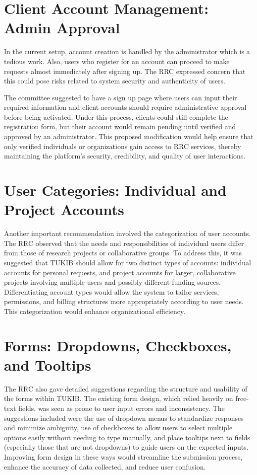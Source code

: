 \section{Client Account Management: Admin Approval}
In the current setup, account creation is handled by the administrator which is a tedious work. Also, users who register for an account can proceed to make requests almost immediately after signing up. The RRC expressed concern that this could pose risks related to system security and authenticity of users.

The committee suggested to have a sign up page where users can input their required information and client accounts should require administrative approval before being activated. Under this process, clients could still complete the registration form, but their account would remain pending until verified and approved by an administrator. This proposed modification would help ensure that only verified individuals or organizations gain access to RRC services, thereby maintaining the platform’s security, credibility, and quality of user interactions.

\section{User Categories: Individual and Project Accounts}
Another important recommendation involved the categorization of user accounts. The RRC observed that the needs and responsibilities of individual users differ from those of research projects or collaborative groups. To address this, it was suggested that TUKIB should allow for two distinct types of accounts: individual accounts for personal requests, and project accounts for larger, collaborative projects involving multiple users and possibly different funding sources. Differentiating account types would allow the system to tailor services, permissions, and billing structures more appropriately according to user needs. This categorization would enhance organizational efficiency.

\section{Forms: Dropdowns, Checkboxes, and Tooltips}
The RRC also gave detailed suggestions regarding the structure and usability of the forms within TUKIB. The existing form design, which relied heavily on free-text fields, was seen as prone to user input errors and inconsistency. The suggestions included were the use of dropdown menus to standardize responses and minimize ambiguity, use of checkboxes to allow users to select multiple options easily without needing to type manually, and place tooltips next to fields (especially those that are not dropdowns) to guide users on the expected inputs. Improving form design in these ways would streamline the submission process, enhance the accuracy of data collected, and reduce user confusion.

